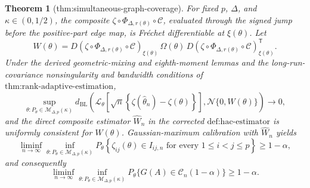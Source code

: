\documentclass{article}
\newtheorem{theorem}{Theorem}
\begin{document}
\begin{theorem}[thm:simultaneous-graph-coverage]\label{thm:simultaneous-graph-coverage}
For fixed \(p\), \(\Delta\), and \(\kappa\in(0,1/2)\), the composite \(\zeta\circ\Phi_{\Delta,r(\theta)}\circ\mathcal C\), evaluated through the signed jump before the positive-part edge map, is Fr\'{e}chet differentiable at \(\xi(\theta)\). Let \[W(\theta)=D(\zeta\circ\Phi_{\Delta,r(\theta)}\circ\mathcal C)_{\xi(\theta)}\,\Omega(\theta)\,D(\zeta\circ\Phi_{\Delta,r(\theta)}\circ\mathcal C)_{\xi(\theta)}^{\mathsf T}.\] Under the derived geometric-mixing and eighth-moment lemmas and the long-run-covariance nonsingularity and bandwidth conditions of \(\text{thm:rank-adaptive-estimation}\), \[\sup_{\theta:P_{\theta}\in\mathcal M_{\Delta,p}(\kappa)}d_{\mathrm{BL}}\left(\mathcal L_{\theta}\left[\sqrt n\left\{\zeta(\widehat\theta_n)-\zeta(\theta)\right\}\right],\mathcal N\{0,W(\theta)\}\right)\longrightarrow0,\] and the direct composite estimator \(\widehat W_n\) in the corrected \(\text{def:hac-estimator}\) is uniformly consistent for \(W(\theta)\). Gaussian-maximum calibration with \(\widehat W_n\) yields \[\liminf_{n\to\infty}\inf_{\theta:P_{\theta}\in\mathcal M_{\Delta,p}(\kappa)}P_{\theta}\left\{\zeta_{ij}(\theta)\in I_{ij,n}\text{ for every }1\leq i<j\leq p\right\}\geq1-\alpha,\] and consequently \[\liminf_{n\to\infty}\inf_{\theta:P_{\theta}\in\mathcal M_{\Delta,p}(\kappa)}P_{\theta}\{G(A)\in\mathcal C_n(1-\alpha)\}\geq1-\alpha.\]
\end{theorem}
\end{document}
